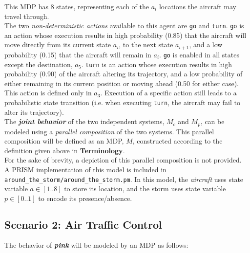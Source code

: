\documentclass{article}
\begin{document}
This MDP has 8 states, representing each of the $a_i$ locations the aircraft may travel through. \\

The two \textit{non-deterministic actions} available to this agent are \texttt{go} and \texttt{turn}. \texttt{go} is an action whose execution results in high probability (0.85) that the aircraft will move directly from its current state $a_i$, to the next state $a_{i+1}$, and a low probability (0.15) that the aircraft will remain in $a_i$. \texttt{go} is enabled in all states except the destination, $a_5$. \texttt{turn} is an action whose execution results in high probability (0.90) of the aircraft altering its trajectory, and a low probability of either remaining in its current position or moving ahead (0.50 for either case). This action is defined only in $a_3$. Execution of a specific action still leads to a probabilistic state transition (i.e.  when executing \texttt{turn}, the aircraft may fail to alter its trajectory).\\

The \textbf{\textit{joint behavior}} of the two independent systems, $M_c$ and $M_p$, can be modeled using a \textit{parallel composition} of the two systems. This parallel composition will be defined as an MDP, $M$, constructed according to the definition given above in \textbf{Terminology}. \\

For the sake of brevity, a depiction of this parallel composition is not provided. \\

A PRISM implementation of this model is included in \texttt{around\_the\_storm/around\_the\_storm.pm}. In this model, the \textit{aircraft} uses state variable $a\in[1..8]$ to store its location, and the storm uses state variable $p\in[0..1]$ to encode its presence/absence. \\


\subsection{Scenario 2: Air Traffic Control}
The behavior of \textbf{\textit{pink}} will be modeled by an MDP as follows:
\end{document}
